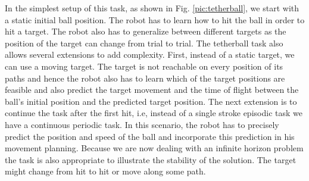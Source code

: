 \documentclass[11pt, article, colorback]{article}
\begin{document}
In the simplest setup of this task, as shown in Fig. \ref{pic:tetherball}, we start with a static initial ball position. The robot has to learn how to hit the ball in order to hit a target. The robot also has to generalize between different 
targets as the position of the target can change from trial to trial. The tetherball task also allows several extensions to add complexity. First, instead of a static target, we can use a 
moving target. The target is not reachable on every position of its paths and hence the robot also has to learn which of the target positions are feasible and also predict the target movement and the time of flight between 
the ball's initial position and the predicted target position. The next extension is to continue 
the task after the first hit, i.e, instead of a single stroke episodic task we have a continuous periodic task. In this scenario, the robot has to precisely predict the 
position and speed of the ball and incorporate this prediction in his movement planning. Because we are now dealing with an infinite horizon problem the task is also appropriate to illustrate the stability of the solution. 
The target might change from hit to hit or move along some path.
\end{document}
